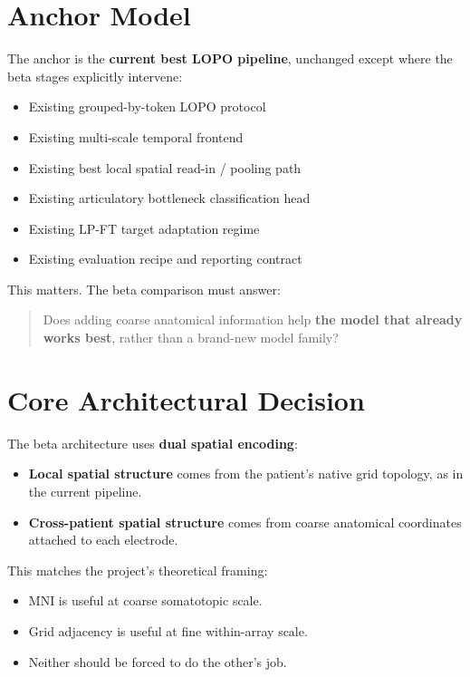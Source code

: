 \documentclass[
]{article}
\providecommand{\tightlist}{%
  \setlength{\itemsep}{0pt}\setlength{\parskip}{0pt}}
\begin{document}
\section{Anchor Model}\label{anchor-model}

The anchor is the \textbf{current best LOPO pipeline}, unchanged except
where the beta stages explicitly intervene:

\begin{itemize}
\tightlist
\item
  Existing grouped-by-token LOPO protocol
\item
  Existing multi-scale temporal frontend
\item
  Existing best local spatial read-in / pooling path
\item
  Existing articulatory bottleneck classification head
\item
  Existing LP-FT target adaptation regime
\item
  Existing evaluation recipe and reporting contract
\end{itemize}

This matters. The beta comparison must answer:

\begin{quote}
Does adding coarse anatomical information help \textbf{the model that
already works best}, rather than a brand-new model family?
\end{quote}

\section{Core Architectural Decision}\label{core-architectural-decision}

The beta architecture uses \textbf{dual spatial encoding}:

\begin{itemize}
\tightlist
\item
  \textbf{Local spatial structure} comes from the patient's native grid
  topology, as in the current pipeline.
\item
  \textbf{Cross-patient spatial structure} comes from coarse anatomical
  coordinates attached to each electrode.
\end{itemize}

This matches the project's theoretical framing:

\begin{itemize}
\tightlist
\item
  MNI is useful at coarse somatotopic scale.
\item
  Grid adjacency is useful at fine within-array scale.
\item
  Neither should be forced to do the other's job.
\end{itemize}
\end{document}
